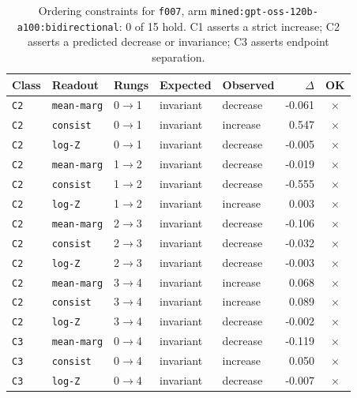 \documentclass[11pt]{article}
\begin{document}
\begin{table}[htbp]
\centering
\small
\caption{Ordering constraints for \texttt{f007}, arm \texttt{mined:gpt-oss-120b-a100:bidirectional}: 0 of 15 hold. C1 asserts a strict increase; C2 asserts a predicted decrease or invariance; C3 asserts endpoint separation.}
\label{tab:ladder-f007-mined-gpt-oss-120b-a100-bidirectional}
\begin{tabular}{lllllrc}
\toprule
Class & Readout & Rungs & Expected & Observed & $\Delta$ & OK \\
\midrule
\texttt{C2} & \texttt{mean-marg} & 0$\to$1 & invariant & decrease & -0.061 & $\times$ \\
\texttt{C2} & \texttt{consist} & 0$\to$1 & invariant & increase & 0.547 & $\times$ \\
\texttt{C2} & \texttt{log-Z} & 0$\to$1 & invariant & decrease & -0.005 & $\times$ \\
\texttt{C2} & \texttt{mean-marg} & 1$\to$2 & invariant & decrease & -0.019 & $\times$ \\
\texttt{C2} & \texttt{consist} & 1$\to$2 & invariant & decrease & -0.555 & $\times$ \\
\texttt{C2} & \texttt{log-Z} & 1$\to$2 & invariant & increase & 0.003 & $\times$ \\
\texttt{C2} & \texttt{mean-marg} & 2$\to$3 & invariant & decrease & -0.106 & $\times$ \\
\texttt{C2} & \texttt{consist} & 2$\to$3 & invariant & decrease & -0.032 & $\times$ \\
\texttt{C2} & \texttt{log-Z} & 2$\to$3 & invariant & decrease & -0.003 & $\times$ \\
\texttt{C2} & \texttt{mean-marg} & 3$\to$4 & invariant & increase & 0.068 & $\times$ \\
\texttt{C2} & \texttt{consist} & 3$\to$4 & invariant & increase & 0.089 & $\times$ \\
\texttt{C2} & \texttt{log-Z} & 3$\to$4 & invariant & decrease & -0.002 & $\times$ \\
\texttt{C3} & \texttt{mean-marg} & 0$\to$4 & invariant & decrease & -0.119 & $\times$ \\
\texttt{C3} & \texttt{consist} & 0$\to$4 & invariant & increase & 0.050 & $\times$ \\
\texttt{C3} & \texttt{log-Z} & 0$\to$4 & invariant & decrease & -0.007 & $\times$ \\
\bottomrule
\end{tabular}
\end{table}
\end{document}
